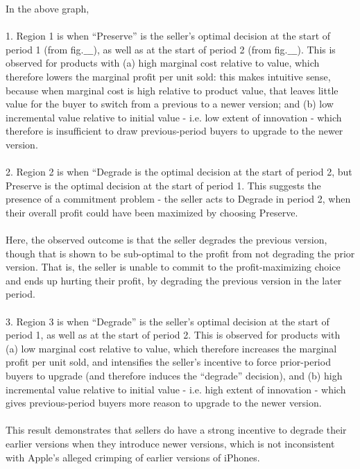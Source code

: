 \documentclass{article}
\begin{document}
In the above graph, \\
\\
1. Region 1 is when {``}Preserve{''} is the seller{'}s optimal decision at the start of period 1 (from fig.$\_\_\_$), as well as at the start of
period 2 (from fig.$\_\_\_$). This is observed for products with (a) high marginal cost relative to value, which therefore lowers the marginal profit
per unit sold: this makes intuitive sense, because when marginal cost is high relative to product value, that leaves little value for the buyer to
switch from a previous to a newer version; and (b) low incremental value relative to initial value - i.e. low extent of innovation - which therefore
is insufficient to draw previous-period buyers to upgrade to the newer version. \\
\\
2. Region 2 is when {``}Degrade is the optimal decision at the start of period 2, but Preserve is the optimal decision at the start of period 1.
This suggests the presence of a commitment problem - the seller acts to Degrade in period 2, when their overall profit could have been maximized
by choosing Preserve.\\
\\
Here, the observed outcome is that the seller degrades the previous version, though that is shown to be sub-optimal to the profit from not degrading
the prior version. That is, the seller is unable to commit to the profit-maximizing choice and ends up hurting their profit, by degrading the previous
version in the later period.\\
\\
3. Region 3 is when {``}Degrade{''} is the seller{'}s optimal decision at the start of period 1, as well as at the start of period 2. This is observed
for products with (a) low marginal cost relative to value, which therefore increases the marginal profit per unit sold, and intensifies the seller{'}s
incentive to force prior-period buyers to upgrade (and therefore induces the {``}degrade{''} decision), and (b) high incremental value relative to
initial value - i.e. high extent of innovation - which gives previous-period buyers more reason to upgrade to the newer version.\\
\\
This result demonstrates that sellers do have a strong incentive to degrade their earlier versions when they introduce newer versions, which is not
inconsistent with Apple{'}s alleged crimping of earlier versions of iPhones.\\
\end{document}

